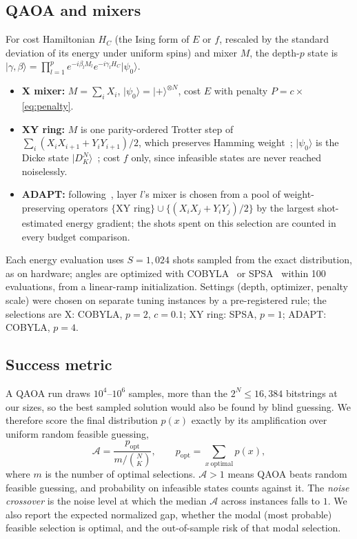 \documentclass[11pt]{article}
\newcommand{\Amp}{\mathcal{A}}
\begin{document}
\subsection{QAOA and mixers}
For cost Hamiltonian $H_C$ (the Ising form of $E$ or $f$, rescaled by the standard deviation of its
energy under uniform spins) and mixer $M$, the depth-$p$ state is
$\lvert\gamma,\beta\rangle=\prod_{l=1}^{p} e^{-i\beta_l M_l} e^{-i\gamma_l H_C}\lvert\psi_0\rangle$.
\begin{itemize}
  \item \textbf{X mixer:} $M=\sum_i X_i$, $\lvert\psi_0\rangle=\lvert{+}\rangle^{\otimes N}$, cost $E$ with
        penalty $P=c\times$\eqref{eq:penalty}.
  \item \textbf{XY ring:} $M$ is one parity-ordered Trotter step of $\sum_i (X_iX_{i+1}+Y_iY_{i+1})/2$,
        which preserves Hamming weight~\citep{hadfield2019,wang2020xy}; $\lvert\psi_0\rangle$ is the Dicke
        state $\lvert D^N_K\rangle$~\citep{bartschi2019dicke}; cost $f$ only, since infeasible states are
        never reached noiselessly.
  \item \textbf{ADAPT:} following~\citet{zhu2022adapt}, layer $l$'s mixer is chosen from a pool of
        weight-preserving operators $\{$XY ring$\}\cup\{(X_iX_j+Y_iY_j)/2\}$ by the largest shot-estimated
        energy gradient; the shots spent on this selection are counted in every budget comparison.
\end{itemize}
Each energy evaluation uses $S=1{,}024$ shots sampled from the exact distribution, as on hardware;
angles are optimized with COBYLA~\citep{powell1994} or SPSA~\citep{spall1992} within 100
evaluations, from a linear-ramp initialization. Settings (depth, optimizer, penalty scale) were
chosen on separate tuning instances by a pre-registered rule; the selections are X: COBYLA,
$p=2$, $c=0.1$; XY ring: SPSA, $p=1$; ADAPT: COBYLA, $p=4$.

\subsection{Success metric}\label{sec:metric}
A QAOA run draws $10^4$--$10^6$ samples, more than the $2^N\le16{,}384$ bitstrings at our sizes,
so the best sampled solution would also be found by blind guessing. We therefore score the
final distribution $p(x)$ exactly by its amplification over uniform random feasible guessing,
\begin{equation}
  \Amp = \frac{p_{\mathrm{opt}}}{m/\binom{N}{K}}, \qquad p_{\mathrm{opt}} = \sum_{x\ \text{optimal}} p(x),
\end{equation}
where $m$ is the number of optimal selections. $\Amp>1$ means QAOA beats random feasible guessing,
and probability on infeasible states counts against it. The \emph{noise crossover} is the noise
level at which the median $\Amp$ across instances falls to $1$. We also report the expected
normalized gap, whether the modal (most probable) feasible selection is optimal, and the
out-of-sample risk of that modal selection.
\end{document}
